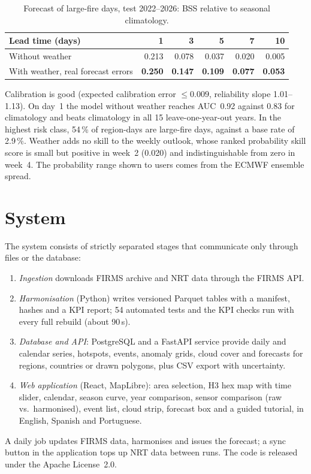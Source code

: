 \documentclass[11pt,a4paper]{article}
\begin{document}
\begin{table}[ht]
\centering\small
\caption{Forecast of large-fire days, test 2022--2026: BSS relative to seasonal climatology.}
\label{tab:forecast}
\begin{tabular}{@{}lrrrrr@{}}
\toprule
Lead time (days) & 1 & 3 & 5 & 7 & 10 \\
\midrule
Without weather & 0.213 & 0.078 & 0.037 & 0.020 & 0.005 \\
With weather, real forecast errors & \textbf{0.250} & \textbf{0.147} & \textbf{0.109} & \textbf{0.077} & \textbf{0.053} \\
\bottomrule
\end{tabular}
\end{table}

Calibration is good (expected calibration error $\leq 0.009$, reliability slope 1.01--1.13). On day~1 the
model without weather reaches AUC~0.92 against 0.83 for climatology and beats climatology in all 15
leave-one-year-out years. In the highest risk class, 54\,\% of region-days are large-fire days, against a
base rate of 2.9\,\%. Weather adds no skill to the weekly outlook, whose ranked probability skill score
\cite{wilks2011} is small but positive in week~2 (0.020) and indistinguishable from zero in week~4. The
probability range shown to users comes from the ECMWF ensemble spread.

\section{System}\label{sec:system}

The system consists of strictly separated stages that communicate only through files or the database:
\begin{enumerate}
  \item \emph{Ingestion} downloads FIRMS archive and NRT data through the FIRMS API.
  \item \emph{Harmonisation} (Python) writes versioned Parquet tables with a manifest, hashes and a KPI
        report; 54 automated tests and the KPI checks run with every full rebuild (about 90\,s).
  \item \emph{Database and API}: PostgreSQL and a FastAPI service provide daily and calendar series,
        hotspots, events, anomaly grids, cloud cover and forecasts for regions, countries or drawn polygons,
        plus CSV export with uncertainty.
  \item \emph{Web application} (React, MapLibre): area selection, H3 hex map with time slider, calendar,
        season curve, year comparison, sensor comparison (raw vs.\ harmonised), event list, cloud strip,
        forecast box and a guided tutorial, in English, Spanish and Portuguese.
\end{enumerate}
A daily job updates FIRMS data, harmonises and issues the forecast; a sync button in the application tops
up NRT data between runs. The code is released under the Apache License~2.0.
\end{document}
